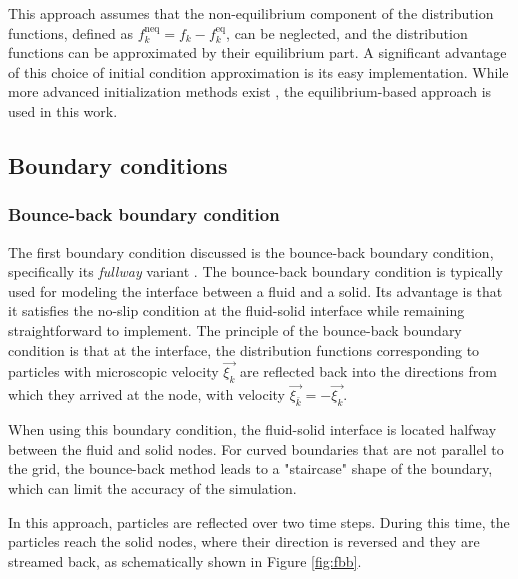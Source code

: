 This approach assumes that the non-equilibrium component of the distribution functions, defined as \( f^{\mathrm{neq}}_{k} = f_{k} - f^{\mathrm{eq}}_{k} \), can be neglected, and the distribution functions can be approximated by their equilibrium part. A significant advantage of this choice of initial condition approximation is its easy implementation. While more advanced initialization methods exist  \cite{PE}, the equilibrium-based approach is used in this work.

\subsection{Boundary conditions}


\subsubsection{Bounce-back boundary condition}\label{bounce-back}
The first boundary condition discussed is the bounce-back boundary condition, specifically its \textit{fullway} variant \cite{Kruger}. The bounce-back boundary condition is typically used for modeling the interface between a fluid and a solid. Its advantage is that it satisfies the no-slip condition at the fluid-solid interface while remaining straightforward to implement. The principle of the bounce-back boundary condition is that at the interface, the distribution functions corresponding to particles with microscopic velocity \( \vec{\xi_{k}} \) are reflected back into the directions from which they arrived at the node, with velocity \( \vec{\xi_{\bar{k}}} = -\vec{\xi_{k}} \).

When using this boundary condition, the fluid-solid interface is located halfway between the fluid and solid nodes. For curved boundaries that are not parallel to the grid, the bounce-back method leads to a "staircase" shape of the boundary, which can limit the accuracy of the simulation.

In this approach, particles are reflected over two time steps. During this time, the particles reach the solid nodes, where their direction is reversed and they are streamed back, as schematically shown in Figure \ref{fig:fbb}.

